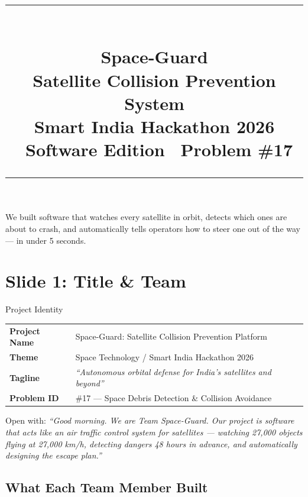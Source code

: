 \documentclass[11pt,a4paper]{article}
\title{
  \vspace{-1em}
  {\color{spaceblue}\rule{\linewidth}{2pt}}\\[0.6em]
  {\fontsize{24}{28}\selectfont\textbf{Space-Guard}}\\[0.3em]
  {\large\textbf{Satellite Collision Prevention System}}\\[0.2em]
  {\normalsize Smart India Hackathon 2026 \textbullet\ Software Edition \textbullet\ Problem \#17}\\[0.4em]
  {\color{spaceblue}\rule{\linewidth}{1pt}}
}
\author{}
\date{}
\begin{document}
\maketitle
\thispagestyle{empty}
\vspace{-1.5em}

\begin{tcolorbox}[
  colback=darkbg, colframe=spaceblue!60!black, coltitle=white,
  coltext=white, title=\textbf{One-Line Summary},
  fontupper=\large\bfseries, halign upper=center
]
We built software that watches every satellite in orbit, detects which ones are about to crash, and automatically tells operators how to steer one out of the way --- in under 5 seconds.
\end{tcolorbox}

\vspace{0.5em}
\tableofcontents
\newpage

\section{Slide 1: Title \& Team}

\begin{slidebox}{Project Identity}
\begin{tabular}{@{}ll@{}}
\textbf{Project Name} & Space-Guard: Satellite Collision Prevention Platform \\
\textbf{Theme}        & Space Technology / Smart India Hackathon 2026 \\
\textbf{Tagline}      & \textit{``Autonomous orbital defense for India's satellites and beyond''} \\
\textbf{Problem ID}   & \#17 --- Space Debris Detection \& Collision Avoidance \\
\end{tabular}
\end{slidebox}

\begin{presenterbox}
Open with: \textit{``Good morning. We are Team Space-Guard. Our project is software that acts like an air traffic control system for satellites --- watching 27,000 objects flying at 27,000 km/h, detecting dangers 48 hours in advance, and automatically designing the escape plan.''}
\end{presenterbox}

\subsection*{What Each Team Member Built}
\end{document}
